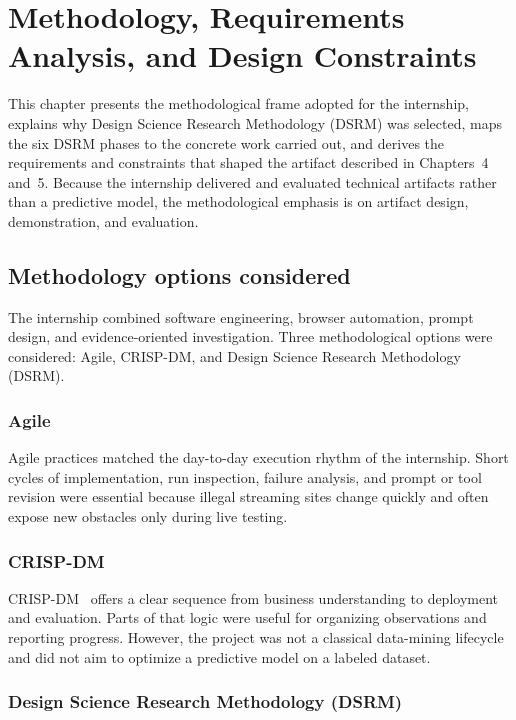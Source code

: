 \chapter{Methodology, Requirements Analysis, and Design Constraints}

This chapter presents the methodological frame adopted for the internship, explains why
Design Science Research Methodology (DSRM) was selected, maps the six DSRM phases to
the concrete work carried out, and derives the requirements and constraints that shaped
the artifact described in Chapters~4 and~5. Because the internship delivered and
evaluated technical artifacts rather than a predictive model, the methodological
emphasis is on artifact design, demonstration, and evaluation.

\section{Methodology options considered}

The internship combined software engineering, browser automation, prompt design, and
evidence-oriented investigation. Three methodological options were considered: Agile,
CRISP-DM, and Design Science Research Methodology (DSRM).

\subsection{Agile}

Agile practices matched the day-to-day execution rhythm of the internship. Short cycles
of implementation, run inspection, failure analysis, and prompt or tool revision were
essential because illegal streaming sites change quickly and often expose new obstacles
only during live testing.

\subsection{CRISP-DM}

CRISP-DM~\cite{crispdm} offers a clear sequence from business understanding to
deployment and evaluation. Parts of that logic were useful for organizing observations
and reporting progress. However, the project was not a classical data-mining lifecycle
and did not aim to optimize a predictive model on a labeled dataset.

\subsection{Design Science Research Methodology (DSRM)}

